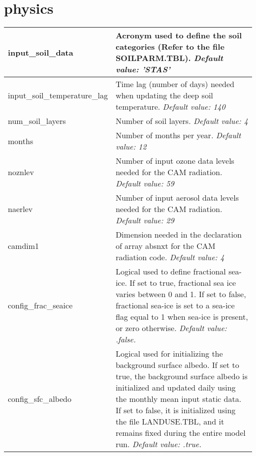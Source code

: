 \section{physics}

{\small
\begin{longtable}{|p{2.0in} |p{4.25in}|}
 \hline
  input\_soil\_data         &  Acronym used to define the soil categories \hfill\break (Refer to the file SOILPARM.TBL).  \newline 
  {\em Default value: 'STAS'} \\ \hline  

  input\_soil\_temperature\_lag &  Time lag (number of days) needed when updating the deep soil temperature.  \newline 
  {\em Default value: 140} \\ \hline

  num\_soil\_layers         & Number of soil layers. \newline 
  {\em Default value: 4} \\ \hline 
  
  months         &  Number of months per year. \newline 
  {\em Default value: 12} \\ \hline   
  
  noznlev         &  Number of input ozone data levels needed for the CAM radiation. \newline 
  {\em Default value: 59} \\ \hline
  
  naerlev         &  Number of input aerosol data levels needed for the CAM radiation.  \newline 
  {\em Default value: 29} \\ \hline
  
  camdim1         &  Dimension needed in the declaration of array absnxt for the CAM radiation code. \newline 
  {\em Default value: 4} \\ \hline
         
  config\_frac\_seaice &  Logical used to define fractional sea-ice. If set to true, fractional sea ice varies between 0 and 1. If set to false, fractional sea-ice is set to a sea-ice flag equal to 1 when sea-ice is present, or zero otherwise. \newline 
  {\em Default value: .false.} \\ \hline

  config\_sfc\_albedo & Logical used for initializing the background surface albedo. If set to true, the background surface albedo is initialized and updated daily using the monthly mean input static data. If set to false, it is initialized using the file LANDUSE.TBL, and it remains fixed during the entire model run. \newline 
  {\em Default value: .true.} \\ \hline
  

\end{longtable}}
